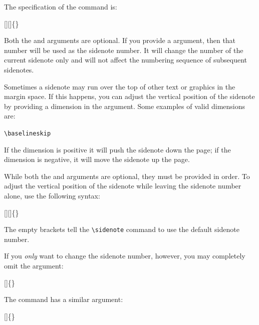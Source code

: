 \documentclass[
  letterpaper,
  DIV=11,
  numbers=noendperiod]{scrartcl}
\begin{document}
The specification of the  command is:

\begin{docspec}
  [][]\{\}
\end{docspec}

Both the  and  arguments are optional. If
you provide a  argument, then that number will be used as
the sidenote number. It will change the number of the current sidenote
only and will not affect the numbering sequence of subsequent sidenotes.

Sometimes a sidenote may run over the top of other text or graphics in
the margin space. If this happens, you can adjust the vertical position
of the sidenote by providing a dimension in the 
argument. Some examples of valid dimensions are:

\begin{docspec}
  \ttfamily 1.0in \qquad 2.54cm \qquad 254mm \Verb|\baselineskip|
\end{docspec}

If the dimension is positive it will push the sidenote down the page; if
the dimension is negative, it will move the sidenote up the page.

While both the  and  arguments are
optional, they must be provided in order. To adjust the vertical
position of the sidenote while leaving the sidenote number alone, use
the following syntax:

\begin{docspec}
  [][]\{\}
\end{docspec}

The empty brackets tell the \Verb|\sidenote| command to use the default
sidenote number.

If you \emph{only} want to change the sidenote number, however, you may
completely omit the  argument:

\begin{docspec}
  []\{\}
\end{docspec}

The  command has a similar 
argument:

\begin{docspec}
  []\{\}
\end{docspec}
\end{document}
